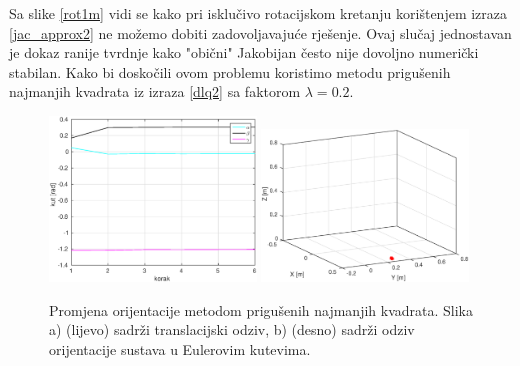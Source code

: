 \documentclass[times, utf8, diplomski, numeric]{fer}
\begin{document}
Sa slike \ref{rot1m} vidi se kako pri isklučivo rotacijskom kretanju korištenjem izraza \ref{jac_approx2} ne možemo dobiti zadovoljavajuće rješenje.
Ovaj slučaj jednostavan je dokaz ranije tvrdnje kako "obični" Jakobijan često nije dovoljno numerički stabilan.
Kako bi doskočili ovom problemu koristimo metodu prigušenih najmanjih kvadrata iz izraza \ref{dlq2} sa faktorom $\lambda = 0.2$.
\begin{figure}[h!]
\centering
\includegraphics[width = 0.49\textwidth]{matlab_rot2}
\includegraphics[width = 0.49\textwidth]{matlab_rot2_xyz}
\caption{Promjena orijentacije metodom prigušenih najmanjih kvadrata.
Slika a) (lijevo) sadrži translacijski odziv, b) (desno) sadrži odziv orijentacije sustava u Eulerovim kutevima.} \label{rot2m}
\end{figure}
\end{document}
